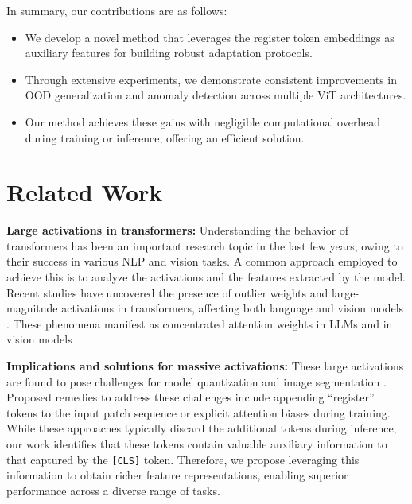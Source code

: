 \documentclass[conference]{IEEEtran}
\begin{document}
In summary, our contributions are as follows:
\begin{itemize}
    \item We develop a novel method that leverages the register token embeddings as auxiliary features for building robust adaptation protocols.
    \item Through extensive experiments, we demonstrate consistent improvements in OOD generalization and anomaly detection across multiple ViT architectures.
    \item Our method achieves these gains with negligible computational overhead during training or inference, offering an efficient solution.
\end{itemize} \section{Related Work}
\noindent\textbf{Large activations in transformers:} 
Understanding the behavior of transformers has been an important research topic in the last few years, owing to their success in various NLP and vision tasks. A common approach employed to achieve this is to analyze the activations and the features extracted by the model. Recent studies have uncovered the presence of outlier weights and large-magnitude activations in transformers, affecting both language \cite{heimersheim2023residual,kovaleva2021bert,zhao2023unveiling,timkey2021all} and vision models \cite{darcet2024vision,mambaregisters}. These phenomena manifest as concentrated attention weights in LLMs \cite{kovaleva2021bert,zhao2023unveiling} and in vision models~\cite{darcet2024vision}

\noindent\textbf{Implications and solutions for massive activations:} These large activations are found to pose challenges for model quantization \cite{dettmers2022gptint,he2024understanding} and image segmentation \cite{darcet2024vision}. Proposed remedies to address these challenges include appending ``register'' tokens to the input patch sequence \cite{darcet2024vision} or explicit attention biases \cite{sun2024massive} during training. While these approaches typically discard the additional tokens during inference, our work identifies that these tokens contain valuable auxiliary information to that captured by the \texttt{[CLS]} token. Therefore, we propose leveraging this information to obtain richer feature representations, enabling superior performance across a diverse range of tasks.
\end{document}
